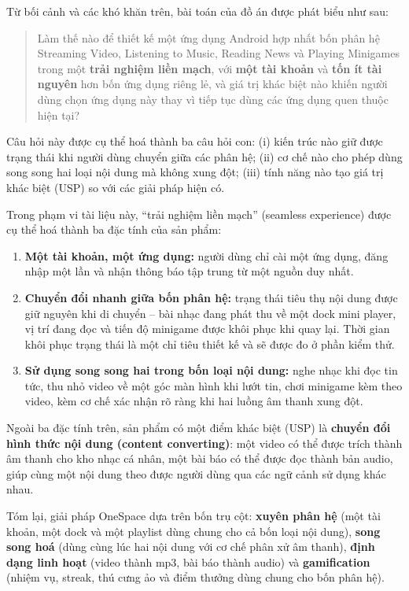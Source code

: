 Từ bối cảnh và các khó khăn trên, bài toán của đồ án được phát biểu như sau:

\begin{quote}
    Làm thế nào để thiết kế một ứng dụng Android hợp nhất bốn phân hệ Streaming Video, Listening to Music, Reading News và Playing Minigames trong một \textbf{trải nghiệm liền mạch}, với \textbf{một tài khoản} và \textbf{tốn ít tài nguyên} hơn bốn ứng dụng riêng lẻ, và giá trị khác biệt nào khiến người dùng chọn ứng dụng này thay vì tiếp tục dùng các ứng dụng quen thuộc hiện tại?
\end{quote}

Câu hỏi này được cụ thể hoá thành ba câu hỏi con: (i) kiến trúc nào giữ được trạng thái khi người dùng chuyển giữa các phân hệ; (ii) cơ chế nào cho phép dùng song song hai loại nội dung mà không xung đột; (iii) tính năng nào tạo giá trị khác biệt (USP) so với các giải pháp hiện có.

Trong phạm vi tài liệu này, ``trải nghiệm liền mạch'' (seamless experience) được cụ thể hoá thành ba đặc tính của sản phẩm:

\begin{enumerate}
    \item \textbf{Một tài khoản, một ứng dụng:} người dùng chỉ cài một ứng dụng, đăng nhập một lần và nhận thông báo tập trung từ một nguồn duy nhất.
    \item \textbf{Chuyển đổi nhanh giữa bốn phân hệ:} trạng thái tiêu thụ nội dung được giữ nguyên khi di chuyển -- bài nhạc đang phát thu về một dock mini player, vị trí đang đọc và tiến độ minigame được khôi phục khi quay lại. Thời gian khôi phục trạng thái là một chỉ tiêu thiết kế và sẽ được đo ở phần kiểm thử.
    \item \textbf{Sử dụng song song hai trong bốn loại nội dung:} nghe nhạc khi đọc tin tức, thu nhỏ video về một góc màn hình khi lướt tin, chơi minigame kèm theo video, kèm cơ chế xác nhận rõ ràng khi hai luồng âm thanh xung đột.
\end{enumerate}

Ngoài ba đặc tính trên, sản phẩm có một điểm khác biệt (USP) là \textbf{chuyển đổi hình thức nội dung (content converting)}: một video có thể được trích thành âm thanh cho kho nhạc cá nhân, một bài báo có thể được đọc thành bản audio, giúp cùng một nội dung theo được người dùng qua các ngữ cảnh sử dụng khác nhau.

Tóm lại, giải pháp OneSpace dựa trên bốn trụ cột: \textbf{xuyên phân hệ} (một tài khoản, một dock và một playlist dùng chung cho cả bốn loại nội dung), \textbf{song song hoá} (dùng cùng lúc hai nội dung với cơ chế phân xử âm thanh), \textbf{định dạng linh hoạt} (video thành mp3, bài báo thành audio) và \textbf{gamification} (nhiệm vụ, streak, thú cưng ảo và điểm thưởng dùng chung cho bốn phân hệ).

